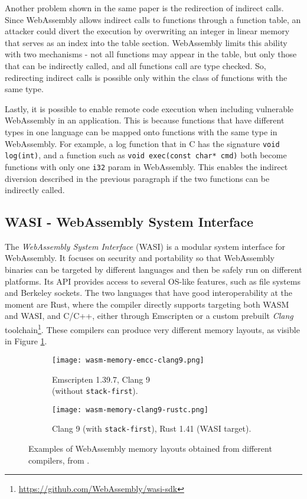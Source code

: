 Another problem shown in the same paper is the redirection of indirect calls. Since WebAssembly allows indirect calls
to functions through a function table, an attacker could divert the execution by overwriting an integer in linear memory
that serves as an index into the table section. WebAssembly limits this ability with two mechanisms - not all functions
may appear in the table, but only those that can be indirectly called, and all functions call are type checked.
So, redirecting indirect calls is possible only within the class of functions with the same type.

Lastly, it is possible to enable remote code execution when including vulnerable WebAssembly in an application.
This is because functions that have different types in one language can be mapped onto functions with the same type
in WebAssembly. For example, a log function that in C has the signature \texttt{void log(int)}, and a function such as
\texttt{void exec(const char* cmd)} both become functions with only one \texttt{i32} param in WebAssembly.
This enables the indirect diversion described in the previous paragraph if the two functions can be indirectly called.

\subsection{WASI - WebAssembly System Interface}
\label{sec:introduction-wasi}

The \textit{WebAssembly System Interface} (WASI) \cite{wasi} is a modular system interface for WebAssembly.
It focuses on security and portability so that WebAssembly binaries can be targeted by different languages
and then be safely run on different platforms.
Its API provides access to several OS-like features, such as file systems and Berkeley sockets.
The two languages that have good interoperability at the moment are Rust, where the compiler directly supports targeting both WASM and WASI,
and C/C++, either through Emscripten or a custom prebuilt \textit{Clang} toolchain\footnote{\url{https://github.com/WebAssembly/wasi-sdk}}.
These compilers can produce very different memory layouts, as visible in Figure \ref{fig:different-wasm-memory-layouts}.

\begin{figure}[ht]
  \centering
  \begin{subfigure}[b]{0.4\textwidth}
    \centering
    \texttt{[image: wasm-memory-emcc-clang9.png]}
    \caption{Emscripten 1.39.7, Clang 9\\(without \texttt{stack-first}).}
  \end{subfigure}
  \begin{subfigure}[b]{0.4\textwidth}
    \centering
    \texttt{[image: wasm-memory-clang9-rustc.png]}
    \caption{Clang 9 (with \texttt{stack-first}), Rust 1.41 (WASI target).}
  \end{subfigure}
  \caption{Examples of WebAssembly memory layouts obtained from different compilers, from \cite{binary-security-wasm-2020}.}
  \label{fig:different-wasm-memory-layouts}
\end{figure}

